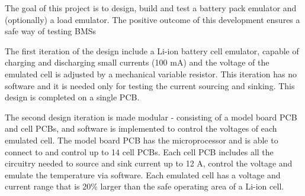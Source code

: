 \IEEEPARstart
{T}{he} goal of this project is to design, build and test a battery pack emulator and (optionally)
a load emulator. The positive outcome of this development ensures a safe way of testing BMSs


The first iteration of the design include a Li-ion battery cell emulator, capable of charging and discharging small currents (100 mA) and
the voltage of the emulated cell is adjusted by a mechanical variable resistor. This iteration has no software and it is needed only for 
testing the current sourcing and sinking. This design is completed on a single PCB.

The second design iteration is made modular - consisting of a model board PCB and cell PCBs, and software is implemented to control the 
voltages of each emulated cell. The model board PCB has the microprocessor and is able to connect to and control up to 14 cell PCBs. Each
cell PCB includes all the circuitry needed to source and sink current up to 12 A, control the voltage and emulate the temperature via software.
Each emulated cell has a voltage and current range that is 20\% larger than the safe operating area of a Li-ion cell.





 




